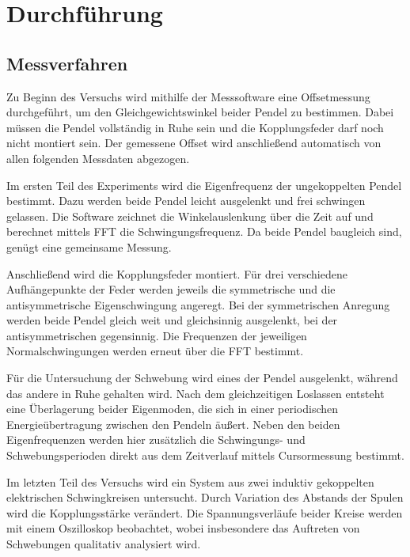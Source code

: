 \chapter{Durchführung} \label{ch:Durchfuehrung}

\section{Messverfahren} \label{sec:Messverfahren}

Zu Beginn des Versuchs wird mithilfe der Messsoftware eine Offsetmessung durchgeführt, um den Gleichgewichtswinkel beider Pendel zu bestimmen. Dabei müssen die Pendel vollständig in Ruhe sein und die Kopplungsfeder darf noch nicht montiert sein. Der gemessene Offset wird anschließend automatisch von allen folgenden Messdaten abgezogen.

Im ersten Teil des Experiments wird die Eigenfrequenz der ungekoppelten Pendel bestimmt. Dazu werden beide Pendel leicht ausgelenkt und frei schwingen gelassen. Die Software zeichnet die Winkelauslenkung über die Zeit auf und berechnet mittels FFT die Schwingungsfrequenz. Da beide Pendel baugleich sind, genügt eine gemeinsame Messung.

Anschließend wird die Kopplungsfeder montiert. Für drei verschiedene Aufhängepunkte der Feder werden jeweils die symmetrische und die antisymmetrische Eigenschwingung angeregt. Bei der symmetrischen Anregung werden beide Pendel gleich weit und gleichsinnig ausgelenkt, bei der antisymmetrischen gegensinnig. Die Frequenzen der jeweiligen Normalschwingungen werden erneut über die FFT bestimmt.

Für die Untersuchung der Schwebung wird eines der Pendel ausgelenkt, während das andere in Ruhe gehalten wird. Nach dem gleichzeitigen Loslassen entsteht eine Überlagerung beider Eigenmoden, die sich in einer periodischen Energieübertragung zwischen den Pendeln äußert. Neben den beiden Eigenfrequenzen werden hier zusätzlich die Schwingungs- und Schwebungsperioden direkt aus dem Zeitverlauf mittels Cursormessung bestimmt.

Im letzten Teil des Versuchs wird ein System aus zwei induktiv gekoppelten elektrischen Schwingkreisen untersucht. Durch Variation des Abstands der Spulen wird die Kopplungsstärke verändert. Die Spannungsverläufe beider Kreise werden mit einem Oszilloskop beobachtet, wobei insbesondere das Auftreten von Schwebungen qualitativ analysiert wird.




